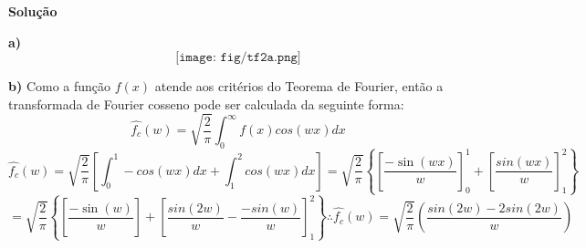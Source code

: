 \linespread{1.5}

\textbf{Solução}

\textbf{a)}
\begin{equation*}
    \texttt{[image: fig/tf2a.png]}
\end{equation*}


\textbf{b)} Como a função $f(x)$ atende aos critérios do Teorema de Fourier, então a transformada de Fourier cosseno pode ser calculada da seguinte forma:
\begin{equation*}
    \hat{f_c}(w) = \sqrt{\frac{2}{\pi}}\int_0^\infty f(x)cos(wx)dx
\end{equation*}
\begin{equation*}
    \hat{f_c}(w) = \sqrt{\frac{2}{\pi}}\left[\int_0^1 -cos(wx)dx + \int_1^2 cos(wx)dx\right] =  \sqrt{\frac{2}{\pi}}\left\{\left[\frac{-\sin(wx)}{w} \right]_0^1 + \left[\frac{sin(wx)}{w}\right]_1^2\right\}
\end{equation*}
\begin{equation*}
    = \sqrt{\frac{2}{\pi}}\left\{\left[\frac{-\sin(w)}{w} \right] + \left[\frac{sin(2w)}{w} - \frac{-sin(w)}{w}\right]_1^2\right\} \therefore \boxed{\hat{f_c}(w) =  \sqrt{\frac{2}{\pi}} \left(\frac{sin(2w) - 2sin(2w)}{w}\right)}
\end{equation*}
